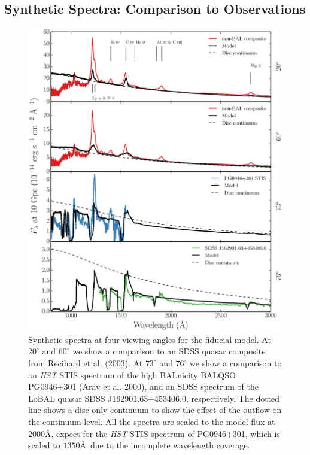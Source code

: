 \documentclass[useAMS,usenatbib]{mn2e_x}
\begin{document}
\subsection{Synthetic Spectra: Comparison to Observations}

\begin{figure}
\centering
\includegraphics[width=1.0\textwidth]{figures/fig3.eps}
\caption
{
Synthetic spectra at four viewing angles for the fiducial model. At 
$20^\circ$ and $60^\circ$ we show a comparison to an SDSS quasar composite
from Recihard et al. (2003). At $73^\circ$ and $76^\circ$ we show a comparison to
an {\sl HST} STIS spectrum of the high BALnicity BALQSO 
PG0946+301 (Arav et al. 2000), and an SDSS spectrum of the LoBAL quasar 
SDSS J162901.63+453406.0, respectively. The dotted line shows a disc
only continuum to show the effect of the outflow on the continuum level. 
All the spectra are scaled to the model flux at $2000$\AA, expect for the 
{\sl HST} STIS spectrum of PG0946+301, which is scaled to $1350$\AA\
due to the incomplete wavelength coverage.
}
\label{fig:uvspec}
\end{figure}
\end{document}
